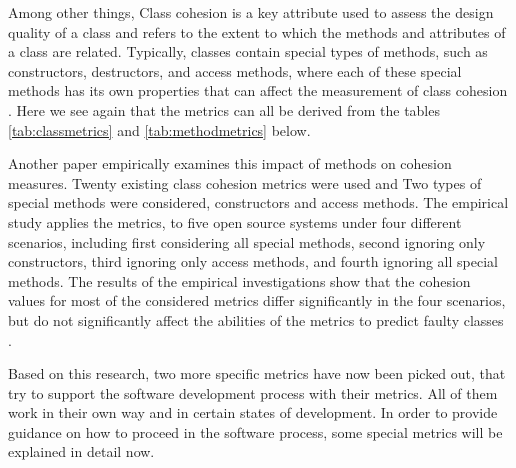 Among other things, Class cohesion is a key attribute used to assess the design quality of a class and refers to the extent to which the methods and attributes of a class are related. Typically, classes contain special types of methods, such as constructors, destructors, and access methods, where each of these special methods has its own properties that can affect the measurement of class cohesion \cite{b4al2012impact}. Here we see again that the metrics can all be derived from the tables \ref{tab:classmetrics} and \ref{tab:methodmetrics} below.

Another paper empirically examines this impact of methods on cohesion measures. Twenty existing class cohesion metrics were used and Two types of special methods were considered, constructors and access methods. The empirical study applies the metrics, to five open source systems under four different scenarios, including first considering all special methods, second ignoring only constructors, third ignoring only access methods, and fourth ignoring all special methods.
The results of the empirical investigations show that the cohesion values for most of the considered metrics differ significantly in the four scenarios, but do not significantly affect the abilities of the metrics to predict faulty classes \cite{b4al2012impact}.

Based on this research, two more specific metrics have now been picked out, that try to support the software development process with their metrics. All of them work in their own way and in certain states of development. 
In order to provide guidance on how to proceed in the software process, some special metrics will be explained in detail now.








